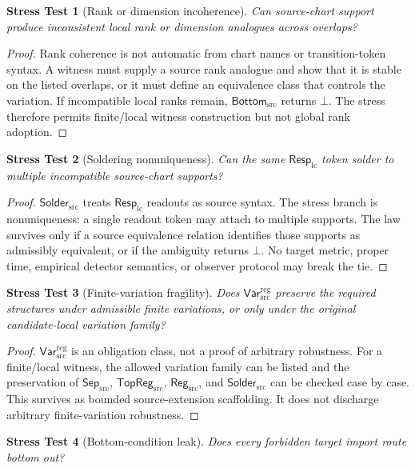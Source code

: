 \documentclass[11pt]{article}
\newcommand{\RespLC}{\mathsf{Resp}_{\mathrm{lc}}}
\newcommand{\SepSrc}{\mathsf{Sep}_{\mathrm{src}}}
\newcommand{\TopRegSrc}{\mathsf{TopReg}_{\mathrm{src}}}
\newcommand{\RegSrc}{\mathsf{Reg}_{\mathrm{src}}}
\newcommand{\SolderSrc}{\mathsf{Solder}_{\mathrm{src}}}
\newcommand{\VarRegSrc}{\mathsf{Var}^{\mathrm{reg}}_{\mathrm{src}}}
\newcommand{\BottomSrc}{\mathsf{Bottom}_{\mathrm{src}}}
\newcommand{\Bot}{\bot}
\newtheorem{stress}{Stress Test}
\begin{document}
\begin{stress}[Rank or dimension incoherence]
Can source-chart support produce inconsistent local rank or dimension
analogues across overlaps?
\end{stress}

\begin{proof}
Rank coherence is not automatic from chart names or transition-token syntax.
A witness must supply a source rank analogue and show that it is stable on the
listed overlaps, or it must define an equivalence class that controls the
variation. If incompatible local ranks remain, \(\BottomSrc\) returns
\(\Bot\). The stress therefore permits finite/local witness construction but
not global rank adoption.
\end{proof}

\begin{stress}[Soldering nonuniqueness]
Can the same \(\RespLC\) token solder to multiple incompatible source-chart
supports?
\end{stress}

\begin{proof}
\(\SolderSrc\) treats \(\RespLC\) readouts as source syntax. The stress branch
is nonuniqueness: a single readout token may attach to multiple supports. The
law survives only if a source equivalence relation identifies those supports
as admissibly equivalent, or if the ambiguity returns \(\Bot\). No target
metric, proper time, empirical detector semantics, or observer protocol may
break the tie.
\end{proof}

\begin{stress}[Finite-variation fragility]
Does \(\VarRegSrc\) preserve the required structures under admissible finite
variations, or only under the original candidate-local variation family?
\end{stress}

\begin{proof}
\(\VarRegSrc\) is an obligation class, not a proof of arbitrary robustness.
For a finite/local witness, the allowed variation family can be listed and
the preservation of \(\SepSrc\), \(\TopRegSrc\), \(\RegSrc\), and
\(\SolderSrc\) can be checked case by case. This survives as bounded
source-extension scaffolding. It does not discharge arbitrary finite-variation
robustness.
\end{proof}

\begin{stress}[Bottom-condition leak]
Does every forbidden target import route bottom out?
\end{stress}
\end{document}
